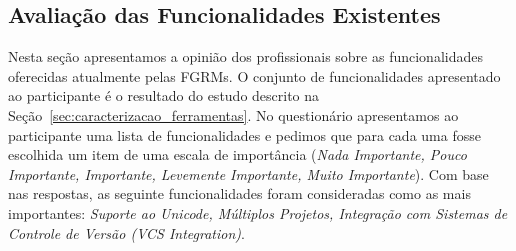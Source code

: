 \subsection{Avaliação das Funcionalidades Existentes}\label{sub:avaliação_das_funcionalidades_existentes}

Nesta seção apresentamos a opinião dos profissionais sobre as funcionalidades
oferecidas atualmente pelas FGRMs\@. O conjunto de funcionalidades apresentado
ao participante é o resultado do estudo descrito na
Seção~\ref{sec:caracterizacao_ferramentas}. No questionário apresentamos ao
participante uma lista de funcionalidades e pedimos que para cada uma fosse
escolhida um item de uma escala de importância (\textit{Nada Importante, Pouco
    Importante, Importante, Levemente Importante, Muito Importante}). Com base
nas respostas, as seguinte funcionalidades foram consideradas como as mais
importantes: \textit{Suporte ao Unicode, Múltiplos Projetos, Integração com
    Sistemas de Controle de Versão (VCS Integration)}.

